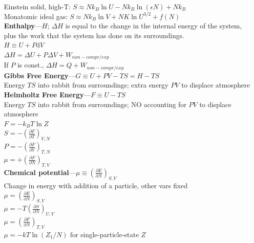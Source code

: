 \documentclass[letterpaper,landscape,10pt]{article}
\begin{document}
{\begin{multicols}{4}
    \hspace{5pt} Einstein solid, high-T: $S \approx Nk_B\ln U - Nk_B\ln (\epsilon N) + Nk_B$ \\
	\hspace{5pt} Monatomic ideal gas: $S \approx Nk_B\ln V + NK\ln U^{3/2} + f(N)$ \\
  \vspace{2.5pt}
  \textbf{Enthalpy}---$H$; $\Delta H$ is equal to the change in the internal
    energy of the system, plus the work that the system has done on its
    surroundings. \\
	\hspace{5pt}$H \equiv U + P \mathrm{d}V$ \\
	\hspace{5pt}$\Delta H = \Delta U + P \Delta V + W_{non-compr/exp}$ \\
	\hspace{5pt}If $P$ is const., $\Delta H = Q + W_{non-compr/exp}$ \\
  \vspace{2.5pt}
  \textbf{Gibbs Free Energy}---$G \equiv U+PV-TS = H-TS$ \\
    \hspace{5pt}Energy $TS$ into rabbit from surroundings; extra energy $PV$ to displace atmosphere \\
  \vspace{2.5pt}
  \textbf{Helmholtz Free Energy}---$F \equiv U - TS$ \\
    \hspace{5pt} Energy $TS$ into rabbit from surroundings; NO accounting for $PV$ to displace atmosphere \\
    \hspace{5pt}$ F = -k_BT \ln Z $\\
    \hspace{5pt}$ S = - \left( \frac{\partial F}{\partial T} \right)_{V,N} $\\
    \hspace{5pt}$ P = - \left( \frac{\partial F}{\partial V} \right)_{T,N} $\\
    \hspace{5pt}$ \mu = + \left( \frac{\partial F}{\partial N} \right)_{T,V} $\\
    \vspace{2.5pt}
	\textbf{Chemical potential}---$\mu\equiv\left( \frac{\partial E}{\partial N} \right)_{S,V}$ \\
    \hspace{5pt}Change in energy with addition of a particle, other vars fixed \\
	\hspace{5pt}$\mu=\left( \frac{\partial E}{\partial N} \right)_{S,V}$ \\
	\hspace{5pt}$\mu=-T\left( \frac{\partial S}{\partial N} \right)_{U,V}$ \\
    \hspace{5pt}$\mu =\left( \frac{\partial F}{\partial N} \right)_{T,V} $\\
    \hspace{5pt}$\mu =-kT \ln \left( Z_1/N \right)$ for single-particle-state $Z$\\


\end{multicols}}
\end{document}
